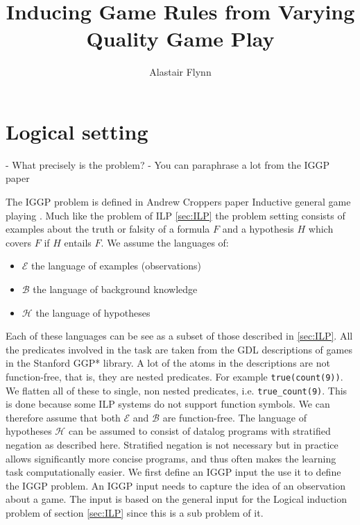 \documentclass[a4paper,12pt]{report}
\begin{document}
\title{\Large{\textbf{Inducing Game Rules from Varying Quality Game Play}}}
\author{Alastair Flynn}
\maketitle





\chapter{Logical setting}\label{LogicalSetting}
    - What precisely is the problem?
    - You can paraphrase a lot from the IGGP paper

The IGGP problem is defined in Andrew Croppers paper Inductive general game playing \cite{Cropper/IGGP}. Much like the problem of ILP \ref{sec:ILP} the problem setting consists of examples about the truth or falsity of a formula $F$ and a hypothesis $H$ which covers $F$ if $H$ entails $F$. We assume the languages of:
\begin{itemize}
\item $\mathscr{E}$ the language of examples (observations)
\item $\mathscr{B}$ the language of background knowledge
\item $\mathscr{H}$ the language of hypotheses
\end{itemize} Each of these languages can be see as a subset of those described in \ref{sec:ILP}. All the predicates involved in the task are taken from the GDL descriptions of games in the Stanford GGP* library. A lot of the atoms in the descriptions are not function-free, that is, they are nested predicates. For example \texttt{true(count(9))}. We flatten all of these to single, non nested predicates, i.e. \texttt{true_count(9)}. This is done because some ILP systems do not support function symbols. We can therefore assume that both $\mathscr{E}$ and $\mathscr{B}$ are function-free. The language of hypotheses $\mathscr{H}$ can be assumed to consist of datalog programs with stratified negation as described here\cite{Kenneth}. Stratified negation is not necessary but in practice allows significantly more concise programs, and thus often makes the learning task computationally easier. We first define an IGGP input the use it to define the IGGP problem. An IGGP input needs to capture the idea of an observation about a game. The input is based on the general input for the Logical induction problem of section \ref{sec:ILP} since this is a sub problem of it.
\end{document}

